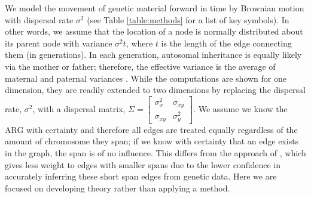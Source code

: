 We model the movement of genetic material forward in time by Brownian motion with dispersal rate $\sigma^2$ (see Table \ref{table:methods} for a list of key symbols). In other words, we assume that the location of a node is normally distributed about its parent node with variance $\sigma^2 t$, where $t$ is the length of the edge connecting them (in generations). In each generation, autosomal inheritance is equally likely via the mother or father; therefore, the effective variance is the average of maternal and paternal variances \citep[e.g., see][]{smith2023dispersal}. While the computations are shown for one dimension, they are readily extended to two dimensions by replacing the dispersal rate, $\sigma^2$, with a dispersal matrix, $\Sigma = \begin{bmatrix} 
    \sigma_x^2 & \sigma_{xy} \\
    \sigma_{xy} & \sigma_y^2
\end{bmatrix}$. We assume we know the ARG with certainty and therefore all edges are treated equally regardless of the amount of chromosome they span; if we know with certainty that an edge exists in the graph, the span is of no influence. This differs from the approach of \cite{grundler2024}, which gives less weight to edges with smaller spans due to the lower confidence in accurately inferring these short span edges from genetic data. Here we are focused on developing theory rather than applying a method.

